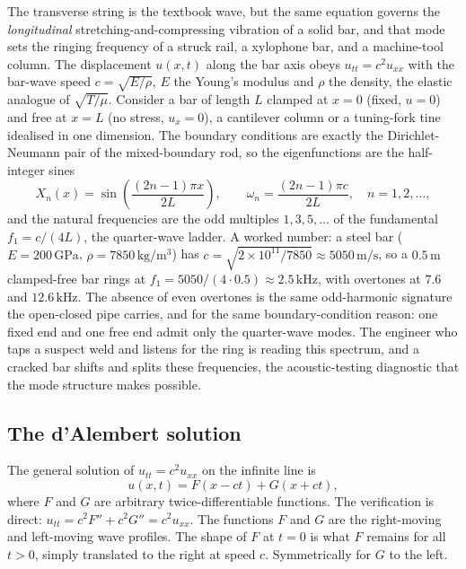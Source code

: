The transverse string is the textbook wave, but the same equation
governs the \emph{longitudinal} stretching-and-compressing vibration
of a solid bar, and that mode sets the ringing frequency of a struck
rail, a xylophone bar, and a machine-tool column. The displacement
$u(x, t)$ along the bar axis obeys $u_{tt} = c^{2} u_{xx}$ with the
bar-wave speed $c = \sqrt{E/\rho}$, $E$ the Young's modulus and $\rho$
the density, the elastic analogue of $\sqrt{T/\mu}$. Consider a bar of
length $L$ clamped at $x = 0$ (fixed, $u = 0$) and free at $x = L$
(no stress, $u_{x} = 0$), a cantilever column or a tuning-fork tine
idealised in one dimension. The boundary conditions are exactly the
Dirichlet-Neumann pair of the mixed-boundary rod, so the eigenfunctions
are the half-integer sines
\[
X_{n}(x) = \sin\!\left(\frac{(2n-1)\pi x}{2L}\right),
\qquad
\omega_{n} = \frac{(2n-1)\pi c}{2L}, \quad n = 1, 2, \ldots,
\]
and the natural frequencies are the odd multiples $1, 3, 5, \ldots$ of
the fundamental $f_{1} = c/(4L)$, the quarter-wave ladder. A worked
number: a steel bar ($E = 200\,\si{\giga\pascal}$, $\rho = 7850\,\si{
\kilogram\per\meter\cubed}$) has $c = \sqrt{2\times 10^{11}/7850}
\approx 5050\,\si{\meter\per\second}$, so a $0.5\,\si{\meter}$
clamped-free bar rings at $f_{1} = 5050/(4\cdot 0.5) \approx 2.5\,\si{
\kilo\hertz}$, with overtones at $7.6$ and $12.6\,\si{\kilo\hertz}$.
The absence of even overtones is the same odd-harmonic signature the
open-closed pipe carries, and for the same boundary-condition reason:
one fixed end and one free end admit only the quarter-wave modes. The
engineer who taps a suspect weld and listens for the ring is reading
this spectrum, and a cracked bar shifts and splits these frequencies,
the acoustic-testing diagnostic that the mode structure makes possible.

\subsection{The d'Alembert solution}

The general solution of $u_{tt} = c^{2} u_{xx}$ on the infinite
line is
\[
u(x, t) = F(x - c t) + G(x + c t),
\]
where $F$ and $G$ are arbitrary twice-differentiable functions.
The verification is direct: $u_{tt} = c^{2} F'' + c^{2} G'' = c^{2}
u_{xx}$. The functions $F$ and $G$ are the right-moving and
left-moving wave profiles. The shape of $F$ at $t = 0$ is what
$F$ remains for all $t > 0$, simply translated to the right at
speed $c$. Symmetrically for $G$ to the left.

